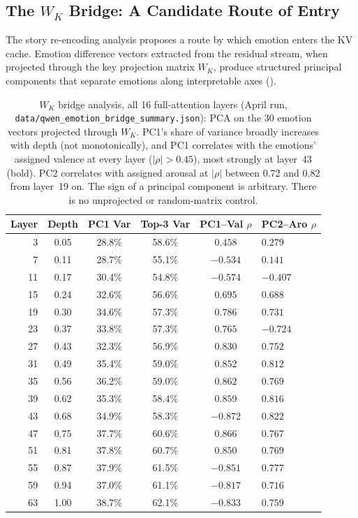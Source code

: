 \subsection{The $W_K$ Bridge: A Candidate Route of Entry}
\label{sec:bridge_results}

The story re-encoding analysis proposes a route by which emotion enters the KV cache. Emotion difference vectors extracted from the residual stream, when projected through the key projection matrix $W_K$, produce structured principal components that separate emotions along interpretable axes ().

\begin{table}[H]
\centering
\caption{$W_K$ bridge analysis, all 16 full-attention layers (April run, \texttt{data/qwen\_emotion\_bridge\_summary.json}): PCA on the 30 emotion vectors projected through $W_K$. PC1's share of variance broadly increases with depth (not monotonically), and PC1 correlates with the emotions' assigned valence at every layer ($|\rho| > 0.45$), most strongly at layer~43 (bold). PC2 correlates with assigned arousal at $|\rho|$ between 0.72 and 0.82 from layer~19 on. The sign of a principal component is arbitrary. There is no unprojected or random-matrix control.}
\label{tab:bridge}
\begin{tabular}{rccccl}
\toprule
\textbf{Layer} & \textbf{Depth} & \textbf{PC1 Var} & \textbf{Top-3 Var} & \textbf{PC1--Val $\rho$} & \textbf{PC2--Aro $\rho$} \\
\midrule
 3 & 0.05 & 28.8\% & 58.6\% & $0.458$ & $0.279$ \\
 7 & 0.11 & 28.7\% & 55.1\% & $-0.534$ & $0.141$ \\
11 & 0.17 & 30.4\% & 54.8\% & $-0.574$ & $-0.407$ \\
15 & 0.24 & 32.6\% & 56.6\% & $0.695$ & $0.688$ \\
19 & 0.30 & 34.6\% & 57.3\% & $0.786$ & $0.731$ \\
23 & 0.37 & 33.8\% & 57.3\% & $0.765$ & $-0.724$ \\
27 & 0.43 & 32.3\% & 56.9\% & $0.830$ & $0.752$ \\
31 & 0.49 & 35.4\% & 59.0\% & $0.852$ & $0.812$ \\
35 & 0.56 & 36.2\% & 59.0\% & $0.862$ & $0.769$ \\
39 & 0.62 & 35.3\% & 58.4\% & $0.859$ & $0.816$ \\
43 & 0.68 & 34.9\% & 58.3\% & $\mathbf{-0.872}$ & $0.822$ \\
47 & 0.75 & 37.7\% & 60.6\% & $0.866$ & $0.767$ \\
51 & 0.81 & 37.8\% & 60.7\% & $0.850$ & $0.769$ \\
55 & 0.87 & 37.9\% & 61.5\% & $-0.851$ & $0.777$ \\
59 & 0.94 & 37.0\% & 61.1\% & $-0.817$ & $0.716$ \\
63 & 1.00 & 38.7\% & 62.1\% & $-0.833$ & $0.759$ \\
\bottomrule
\end{tabular}
\end{table}

